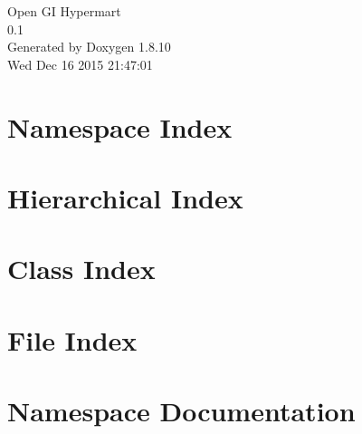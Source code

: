 \documentclass[twoside]{book}
\newcommand{\+}{\discretionary{\mbox{\scriptsize$\hookleftarrow$}}{}{}}
\newcommand{\clearemptydoublepage}{%
  \newpage{\pagestyle{empty}\cleardoublepage}%
}
\begin{document}
\hypersetup{pageanchor=false,
             bookmarks=true,
             bookmarksnumbered=true,
             pdfencoding=unicode
            }
\begin{titlepage}
\vspace*{7cm}
\begin{center}%
{\Large Open G\+I Hypermart \\[1ex]\large 0.\+1 }\\
\vspace*{1cm}
{\large Generated by Doxygen 1.8.10}\\
\vspace*{0.5cm}
{\small Wed Dec 16 2015 21:47:01}\\
\end{center}
\end{titlepage}
\clearemptydoublepage
\tableofcontents
\clearemptydoublepage
{}
\hypersetup{pageanchor=true}

\chapter{Namespace Index}

\chapter{Hierarchical Index}

\chapter{Class Index}

\chapter{File Index}

\chapter{Namespace Documentation}















\end{document}
